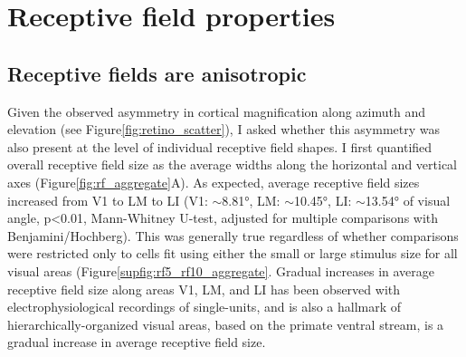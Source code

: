 \section{Receptive field properties}
\subsection{Receptive fields are anisotropic}
Given the observed asymmetry in cortical magnification along azimuth and elevation (see Figure\ref{fig:retino_scatter}), I asked whether this asymmetry was also present at the level of individual receptive field shapes. I first quantified overall receptive field size as the average widths along the horizontal and vertical axes (Figure\ref{fig:rf_aggregate}A). As expected, average receptive field sizes increased from V1 to LM to LI (V1: $\sim$\ang{8.81}, LM: $\sim$\ang{10.45}, LI: $\sim$\ang{13.54} of visual angle, p<0.01, Mann-Whitney U-test, adjusted for multiple comparisons with Benjamini/Hochberg). This was generally true regardless of whether comparisons were restricted only to cells fit using either the small or large stimulus size for all visual areas (Figure\ref{supfig:rf5_rf10_aggregate}. Gradual increases in average receptive field size along areas V1, LM, and LI has been observed with electrophysiological recordings of single-units\cite{Vermaercke2014, Tafazoli2017}, and is also a hallmark of hierarchically-organized visual areas, based on the primate ventral stream, is a gradual increase in average receptive field size\cite{Rust2010SelectivityIT, Vermaercke2014, Siegle2021, Tafazoli2017}.


